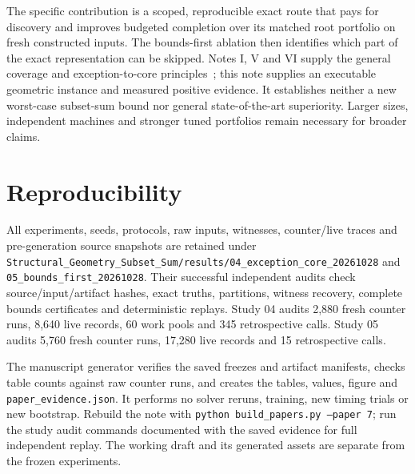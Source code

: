 \documentclass[10pt,english]{article}
\begin{document}
The specific contribution is a scoped, reproducible exact route that pays for discovery and improves budgeted completion over its matched root portfolio on fresh constructed inputs. The bounds-first ablation then identifies which part of the exact representation can be skipped. Notes I, V and VI supply the general coverage and exception-to-core principles~\cite{note1,note5,note6}; this note supplies an executable geometric instance and measured positive evidence. It establishes neither a new worst-case subset-sum bound nor general state-of-the-art superiority. Larger sizes, independent machines and stronger tuned portfolios remain necessary for broader claims.

\section{Reproducibility}
All experiments, seeds, protocols, raw inputs, witnesses, counter/live traces and pre-generation source snapshots are retained under \texttt{Structural\_Geometry\_Subset\_Sum/results/04\_exception\_core\_20261028} and \texttt{05\_bounds\_first\_20261028}. Their successful independent audits check source/input/artifact hashes, exact truths, partitions, witness recovery, complete bounds certificates and deterministic replays. Study 04 audits 2,880 fresh counter runs, 8,640 live records, 60 work pools and 345 retrospective calls. Study 05 audits 5,760 fresh counter runs, 17,280 live records and 15 retrospective calls.

The manuscript generator verifies the saved freezes and artifact manifests, checks table counts against raw counter runs, and creates the tables, values, figure and \texttt{paper\_evidence.json}. It performs no solver reruns, training, new timing trials or new bootstrap. Rebuild the note with \texttt{python build\_papers.py --paper 7}; run the study audit commands documented with the saved evidence for full independent replay. The working draft and its generated assets are separate from the frozen experiments.
\end{document}
